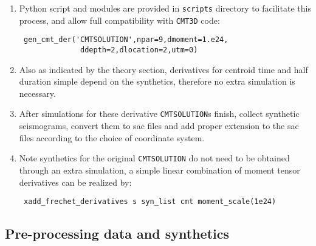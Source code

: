 \documentclass[12pt,titlepage,fleqn]{article}
\begin{document}
\begin{enumerate}
\item 
Python script and modules are provided in \verb+scripts+ directory to facilitate this process, and allow full compatibility with \verb+CMT3D+ code:
\begin{verbatim}
 gen_cmt_der('CMTSOLUTION',npar=9,dmoment=1.e24,
              ddepth=2,dlocation=2,utm=0)
\end{verbatim}
\item Also as indicated by the theory section, derivatives for centroid time and half duration simple depend on the synthetics, therefore no extra simulation is necessary.
\item After simulations for these derivative \verb+CMTSOLUTION+s finish, collect synthetic seismograms, convert them to sac files and add proper extension to the sac files according to the choice of coordinate system.  

\item Note synthetics for the original \verb+CMTSOLUTION+ do not need to be obtained through an extra simulation, a simple linear combination of moment tensor derivatives can be realized by:
\begin{verbatim}
 xadd_frechet_derivatives s syn_list cmt moment_scale(1e24)
\end{verbatim}

\end{enumerate}

\subsection{Pre-processing data and synthetics}
\end{document}
